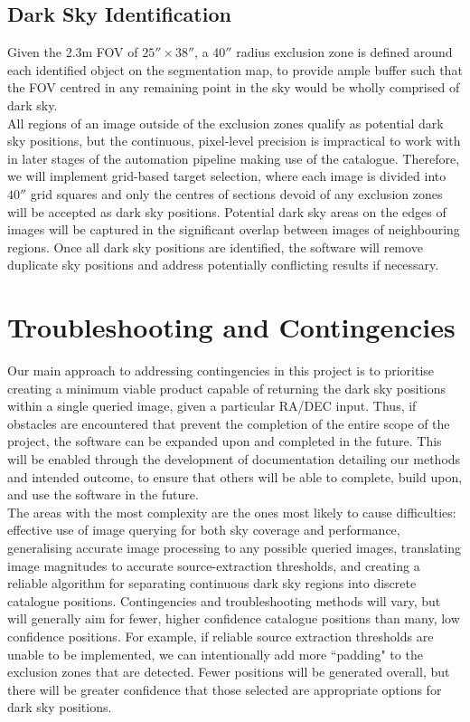 \documentclass[11pt]{article}
\begin{document}
\subsection{Dark Sky Identification}
Given the 2.3m FOV of $25''\times38''$, a $40''$ radius exclusion zone is defined around each identified object on the segmentation map, to provide ample buffer such that the FOV centred in any remaining point in the sky would be wholly comprised of dark sky. \\

All regions of an image outside of the exclusion zones qualify as potential dark sky positions, but the continuous, pixel-level precision is impractical to work with in later stages of the automation pipeline making use of the catalogue. Therefore, we will implement grid-based target selection, where each image is divided into $40''$ grid squares and only the centres of sections devoid of any exclusion zones will be accepted as dark sky positions. Potential dark sky areas on the edges of images will be captured in the significant overlap between images of neighbouring regions. Once all dark sky positions are identified, the software will remove duplicate sky positions and address potentially conflicting results if necessary. 

\section{Troubleshooting and Contingencies}
Our main approach to addressing contingencies in this project is to prioritise creating a minimum viable product capable of returning the dark sky positions within a single queried image, given a particular RA/DEC input. Thus, if obstacles are encountered that prevent the completion of the entire scope of the project, the software can be expanded upon and completed in the future. This will be enabled through the development of documentation detailing our methods and intended outcome, to ensure that others will be able to complete, build upon, and use the software in the future. \\

The areas with the most complexity are the ones most likely to cause difficulties: effective use of image querying for both sky coverage and performance, generalising accurate image processing to any possible queried images, translating image magnitudes to accurate source-extraction thresholds, and creating a reliable algorithm for separating continuous dark sky regions into discrete catalogue positions. Contingencies and troubleshooting methods will vary, but will generally aim for fewer, higher confidence catalogue positions than many, low confidence positions. For example, if reliable source extraction thresholds are unable to be implemented, we can intentionally add more ``padding" to the exclusion zones that are detected. Fewer positions will be generated overall, but there will be greater confidence that those selected are appropriate options for dark sky positions. 
\end{document}
